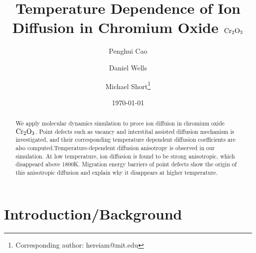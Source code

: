 \documentclass[twocolumn,showpacs,preprintnumbers,amsmath,amssymb,superscriptaddress,prb]{revtex4}
\begin{document}
\title{ Temperature Dependence of Ion Diffusion in Chromium Oxide $\textup{Cr}_2\textup{O}_3$ }

\author{Penghui Cao}
\author{Daniel Wells}
\author{Michael Short\footnote{Corresponding author: hereiam@mit.edu}}

\date{\today}%

\begin{abstract}

We apply molecular dynamics simulation to proce ion diffuion in chromium oxide $\textup{Cr}_2\textup{O}_3$. Point defects such as vacancy and interstital assisted diffusion mechanism is investigated, and their corresponding temperature dependent diffusion coefficients are also computed.Temperature-dependent diffusion anisotropy is observed in our simulation. At low temperature, ion diffusion is found to be strong anisotropic, which disappeard above 1800K. Migration energy barriers of point defects show the origin of this anisotropic diffusion and explain why it disappears at higher temperature. 

\end{abstract}

\maketitle

\section{Introduction/Background}
\end{document}
